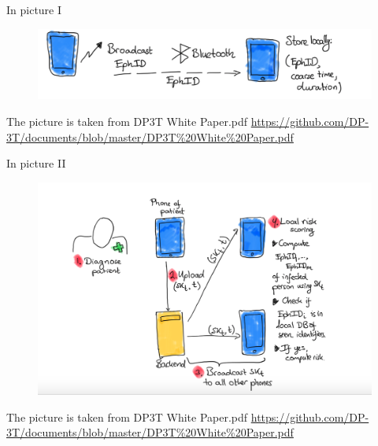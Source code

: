 \documentclass[usenames,dvipsnames, 9pt]{beamer}
\begin{document}
{
	
	\begin{frame}{{\color{Black}In picture I}}
	\vspace{-30pt}
	\begin{figure}
		\includegraphics[width=1.1\textwidth]{Pic1}
	\end{figure}
	\small
	\vfill
	{\color{gray} The picture is taken from DP3T White Paper.pdf \url{https://github.com/DP-3T/documents/blob/master/DP3T\%20White\%20Paper.pdf}}
\end{frame}
	
	\begin{frame}{{\color{Black}In picture II}}
	\vspace{-30pt}
		\begin{figure}
			\includegraphics[width=1.1\textwidth]{Pic2}
		\end{figure}
	\small
	\vspace{-10pt}
	{\color{gray} The picture is taken from DP3T White Paper.pdf \url{https://github.com/DP-3T/documents/blob/master/DP3T\%20White\%20Paper.pdf}}
\end{frame}
}
\end{document}
